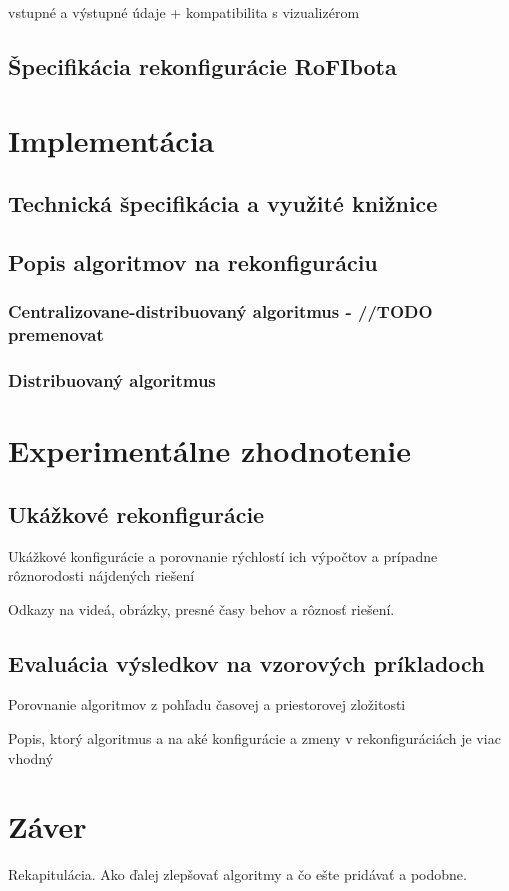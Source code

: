 \documentclass[
  digital, %
  twoside, %
  table,   %
  nolof,     %
  nolot,     %
]{fithesis3}
\begin{document}
\cite{nausovaBachelorThesis}

vstupné a výstupné údaje + kompatibilita s vizualizérom

\section{Špecifikácia rekonfigurácie RoFIbota}
\label{sec:reconfigActions}


\chapter{Implementácia}
\label{sec:implementation}
\section{Technická špecifikácia a využité knižnice}
\label{sec:libraries}
\section{Popis algoritmov na rekonfiguráciu}
\label{sec:algoDesc}
\subsection{Centralizovane-distribuovaný algoritmus - //TODO premenovat}
\subsection{Distribuovaný algoritmus}

\chapter{Experimentálne zhodnotenie}
\section{Ukážkové rekonfigurácie}
Ukážkové konfigurácie a porovnanie rýchlostí ich výpočtov a prípadne rôznorodosti nájdených riešení

Odkazy na videá, obrázky, presné časy behov a rôznosť riešení. 
\section{Evaluácia výsledkov na vzorových príkladoch}
Porovnanie algoritmov z pohľadu časovej a priestorovej zložitosti

Popis, ktorý algoritmus a na aké konfigurácie a zmeny v rekonfiguráciách je viac vhodný

\chapter{Záver}
Rekapitulácia. 
Ako ďalej zlepšovať algoritmy a čo ešte pridávať a podobne. 

  \printbibliography[heading=bibintoc] %
\end{document}
